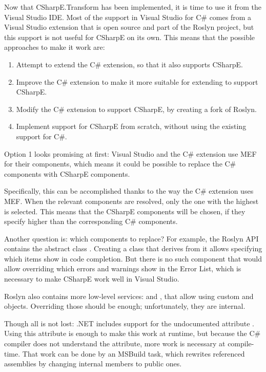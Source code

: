 Now that CSharpE.Transform has been implemented, it is time to use it from the Visual Studio \ac{IDE}. Most of the support in Visual Studio for C\# comes from a Visual Studio extension that is open source and part of the Roslyn project, but this support is not useful for CSharpE on its own. This means that the possible approaches to make it work are:

\begin{enumerate}
\item Attempt to extend the C\# extension, so that it also supports CSharpE.
\item Improve the C\# extension to make it more suitable for extending to support CSharpE.
\item Modify the C\# extension to support CSharpE, by creating a fork of Roslyn.
\item Implement support for CSharpE from scratch, without using the existing support for C\#.
\end{enumerate}

Option 1 looks promising  at first: Visual Studio and the C\# extension use \ac{MEF} for their components, which means it could be possible to replace the C\# components with CSharpE components.

Specifically, this can be accomplished thanks to the way the C\# extension uses \ac{MEF}. When the relevant components are resolved, only the one with the highest  is selected. This means that the CSharpE components will be chosen, if they specify higher  than the corresponding C\# components.

Another question is: which components to replace? For example, the Roslyn \ac{API} contains the abstract class . Creating a class that derives from it allows specifying which items show in code completion. But there is no such component that would allow overriding which errors and warnings show in the Error List, which is necessary to make CSharpE work well in Visual Studio.

Roslyn also contains more low-level services:  and , that allow using custom  and  objects. Overriding those should be enough; unfortunately, they are internal.

Though all is not lost: .NET includes support for the undocumented attribute . \cite{iacta} Using this attribute is enough to make this work at runtime, but because the C\# compiler does not understand the attribute, more work is necessary at compile-time. That work can be done by an MSBuild task, which rewrites referenced assemblies by changing internal members to public ones.\footnotemark \cite{iactg}

